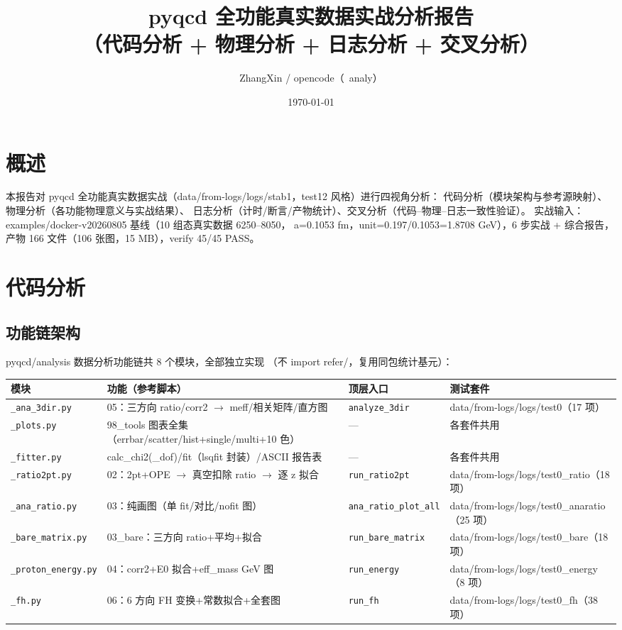 \documentclass[11pt]{article}
\title{pyqcd 全功能真实数据实战分析报告\\（代码分析 + 物理分析 + 日志分析 + 交叉分析）}
\author{ZhangXin / opencode（~analy）}
\date{\today}
\begin{document}
\maketitle

\section{概述}
本报告对 pyqcd 全功能真实数据实战（data/from-logs/logs/stab1，test12 风格）进行四视角分析：
代码分析（模块架构与参考源映射）、物理分析（各功能物理意义与实战结果）、
日志分析（计时/断言/产物统计）、交叉分析（代码--物理--日志一致性验证）。
实战输入：examples/docker-v20260805 基线（10 组态真实数据 6250--8050，
a=0.1053 fm，unit=0.197/0.1053=1.8708 GeV），6 步实战 + 综合报告，
产物 166 文件（106 张图，15 MB），verify 45/45 PASS。

\section{代码分析}
\subsection{功能链架构}
pyqcd/analysis 数据分析功能链共 8 个模块，全部独立实现
（不 import refer/，复用同包统计基元）：

\begin{longtable}{llll}
\hline
模块 & 功能（参考脚本） & 顶层入口 & 测试套件 \\
\hline
\texttt{\_ana\_3dir.py} & 05：三方向 ratio/corr2 $\rightarrow$ meff/相关矩阵/直方图 &
\texttt{analyze\_3dir} & data/from-logs/logs/test0（17 项）\\
\texttt{\_plots.py} & 98\_tools 图表全集（errbar/scatter/hist+single/multi+10 色） & --- & 各套件共用 \\
\texttt{\_fitter.py} & calc\_chi2(\_dof)/fit（lsqfit 封装）/ASCII 报告表 & --- & 各套件共用 \\
\texttt{\_ratio2pt.py} & 02：2pt+OPE $\rightarrow$ 真空扣除 ratio $\rightarrow$ 逐 z 拟合 & \texttt{run\_ratio2pt} & data/from-logs/logs/test0\_ratio（18 项） \\
\texttt{\_ana\_ratio.py} & 03：纯画图（单 fit/对比/nofit 图） & \texttt{ana\_ratio\_plot\_all} & data/from-logs/logs/test0\_anaratio（25 项） \\
\texttt{\_bare\_matrix.py} & 03\_bare：三方向 ratio+平均+拟合 & \texttt{run\_bare\_matrix} & data/from-logs/logs/test0\_bare（18 项） \\
\texttt{\_proton\_energy.py} & 04：corr2+E0 拟合+eff\_mass GeV 图 & \texttt{run\_energy} & data/from-logs/logs/test0\_energy（8 项） \\
\texttt{\_fh.py} & 06：6 方向 FH 变换+常数拟合+全套图 & \texttt{run\_fh} & data/from-logs/logs/test0\_fh（38 项） \\
\hline
\end{longtable}
\end{document}
